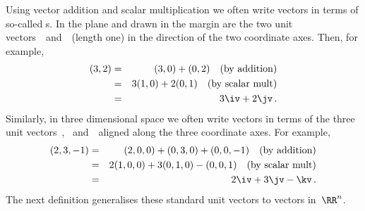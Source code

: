 Using vector addition and scalar multiplication we often write vectors in terms of so-called s.
In the plane and drawn in the margin are the two unit vectors~\iv\ and~\jv\ (length one) in the direction of the two coordinate axes.
Then, for example,
\begin{eqnarray*}
(3,2)&=&(3,0)+(0,2)\quad(\text{by addition})
\\&=&3(1,0)+2(0,1)\quad(\text{by scalar mult})
\\&=&3\iv+2\jv\,.
\end{eqnarray*}
%
Similarly, in three dimensional space we often write vectors in terms of the three unit vectors~\iv, \jv\ and~\kv\ aligned along the three coordinate axes.
For example,
\begin{eqnarray*}
(2,3,-1)&=&(2,0,0)+(0,3,0)+(0,0,-1)\quad(\text{by addition})
\\&=&2(1,0,0)+3(0,1,0)-(0,0,1)\quad(\text{by scalar mult})
\\&=&2\iv+3\jv-\kv\,.
\end{eqnarray*}
The next definition generalises these standard unit vectors to vectors in~\(\RR^n\).


